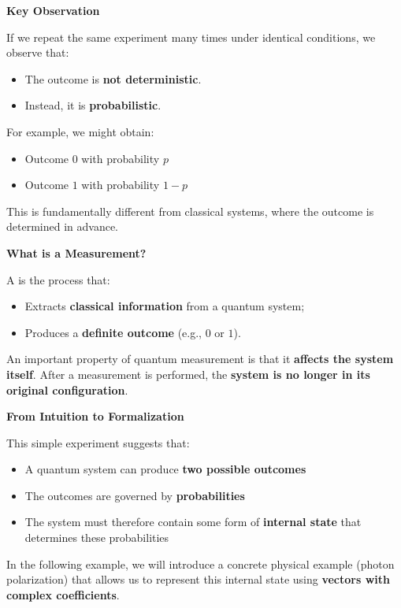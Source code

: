 \highspace
\begin{flushleft}
    \textcolor{Green3}{ \textbf{Key Observation}}
\end{flushleft}
If we repeat the same experiment many times under identical conditions, we observe that:
\begin{itemize}
    \item The outcome is \textbf{not deterministic}.
    \item Instead, it is \textbf{probabilistic}.
\end{itemize}
For example, we might obtain:
\begin{itemize}
    \item Outcome $0$ with probability $p$
    \item Outcome $1$ with probability $1 - p$
\end{itemize}
This is fundamentally different from classical systems, where the outcome is determined in advance.

\highspace
\begin{flushleft}
    \textcolor{Green3}{ \textbf{What is a Measurement?}}
\end{flushleft}
A  is the process that:
\begin{itemize}
    \item Extracts \textbf{classical information} from a quantum system;
    \item Produces a \textbf{definite outcome} (e.g., $0$ or $1$).
\end{itemize}
An important property of quantum measurement is that it \textbf{affects the system itself}. After a measurement is performed, the \textbf{system is no longer in its original configuration}.

\highspace
\begin{flushleft}
    \textcolor{Green3}{ \textbf{From Intuition to Formalization}}
\end{flushleft}
This simple experiment suggests that:
\begin{itemize}
    \item A quantum system can produce \textbf{two possible outcomes}
    \item The outcomes are governed by \textbf{probabilities}
    \item The system must therefore contain some form of \textbf{internal state} that determines these probabilities
\end{itemize}
In the following example, we will introduce a concrete physical example (photon polarization) that allows us to represent this internal state using \textbf{vectors with complex coefficients}.

